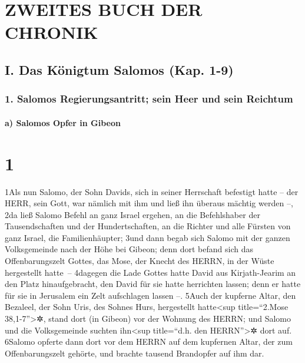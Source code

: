 \hypertarget{zweites-buch-der-chronik}{%
\section{ZWEITES BUCH DER CHRONIK}\label{zweites-buch-der-chronik}}

\hypertarget{i.-das-kuxf6nigtum-salomos-kap.-1-9}{%
\subsection{I. Das Königtum Salomos (Kap.
1-9)}\label{i.-das-kuxf6nigtum-salomos-kap.-1-9}}

\hypertarget{salomos-regierungsantritt-sein-heer-und-sein-reichtum}{%
\subsubsection{1. Salomos Regierungsantritt; sein Heer und sein
Reichtum}\label{salomos-regierungsantritt-sein-heer-und-sein-reichtum}}

\hypertarget{a-salomos-opfer-in-gibeon}{%
\paragraph{a) Salomos Opfer in Gibeon}\label{a-salomos-opfer-in-gibeon}}

\hypertarget{section}{%
\section{1}\label{section}}

1Als nun Salomo, der Sohn Davids, sich in seiner Herrschaft befestigt
hatte -- der HERR, sein Gott, war nämlich mit ihm und ließ ihn überaus
mächtig werden --, 2da ließ Salomo Befehl an ganz Israel ergehen, an die
Befehlshaber der Tausendschaften und der Hundertschaften, an die Richter
und alle Fürsten von ganz Israel, die Familienhäupter; 3und dann begab
sich Salomo mit der ganzen Volksgemeinde nach der Höhe bei Gibeon; denn
dort befand sich das Offenbarungszelt Gottes, das Mose, der Knecht des
HERRN, in der Wüste hergestellt hatte~-- 4dagegen die Lade Gottes hatte
David aus Kirjath-Jearim an den Platz hinaufgebracht, den David für sie
hatte herrichten lassen; denn er hatte für sie in Jerusalem ein Zelt
aufschlagen lassen --. 5Auch der kupferne Altar, den Bezaleel, der Sohn
Uris, des Sohnes Hurs, hergestellt hatte\textless sup title=``2.Mose
38,1-7''\textgreater✲, stand dort (in Gibeon) vor der Wohnung des HERRN;
und Salomo und die Volksgemeinde suchten ihn\textless sup title=``d.h.
den HERRN''\textgreater✲ dort auf. 6Salomo opferte dann dort vor dem
HERRN auf dem kupfernen Altar, der zum Offenbarungszelt gehörte, und
brachte tausend Brandopfer auf ihm dar.


